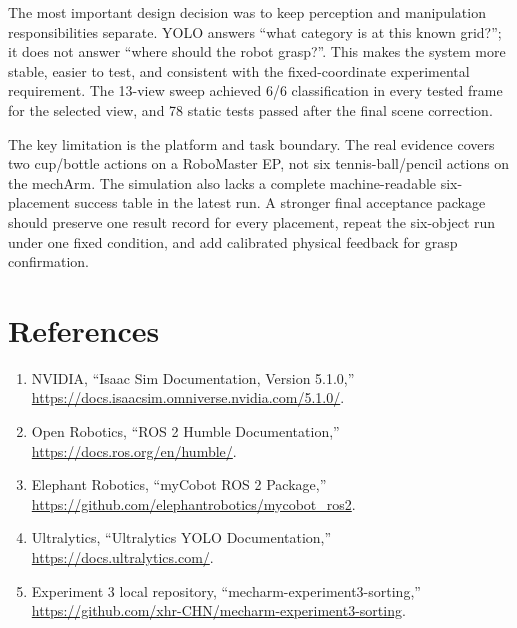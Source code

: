 \documentclass[12pt,a4paper]{article}
\begin{document}
The most important design decision was to keep perception and manipulation responsibilities separate. YOLO answers ``what category is at this known grid?''; it does not answer ``where should the robot grasp?''. This makes the system more stable, easier to test, and consistent with the fixed-coordinate experimental requirement. The 13-view sweep achieved 6/6 classification in every tested frame for the selected view, and 78 static tests passed after the final scene correction.

The key limitation is the platform and task boundary. The real evidence covers two cup/bottle actions on a RoboMaster EP, not six tennis-ball/pencil actions on the mechArm. The simulation also lacks a complete machine-readable six-placement success table in the latest run. A stronger final acceptance package should preserve one result record for every placement, repeat the six-object run under one fixed condition, and add calibrated physical feedback for grasp confirmation.

\section*{References}
\begingroup\sloppy
\begin{enumerate}
  \item NVIDIA, ``Isaac Sim Documentation, Version 5.1.0,'' \url{https://docs.isaacsim.omniverse.nvidia.com/5.1.0/}.
  \item Open Robotics, ``ROS 2 Humble Documentation,'' \url{https://docs.ros.org/en/humble/}.
  \item Elephant Robotics, ``myCobot ROS 2 Package,'' \url{https://github.com/elephantrobotics/mycobot_ros2}.
  \item Ultralytics, ``Ultralytics YOLO Documentation,'' \url{https://docs.ultralytics.com/}.
  \item Experiment 3 local repository, ``mecharm-experiment3-sorting,'' \url{https://github.com/xhr-CHN/mecharm-experiment3-sorting}.
\end{enumerate}
\endgroup
\end{document}
